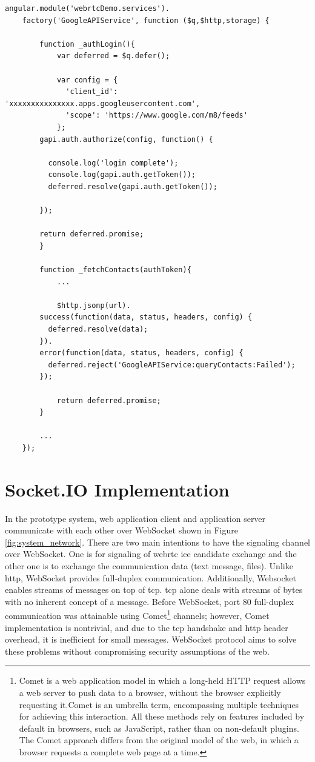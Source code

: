 \begin{lstlisting}[caption={GoogleAPIService.js in application client},label={code:google_api}]
angular.module('webrtcDemo.services').
	factory('GoogleAPIService', function ($q,$http,storage) {

		function _authLogin(){
			var deferred = $q.defer();

			var config = {
		      'client_id': 'xxxxxxxxxxxxxxx.apps.googleusercontent.com',
		      'scope': 'https://www.google.com/m8/feeds'
		    };
	    gapi.auth.authorize(config, function() {

	      console.log('login complete');
	      console.log(gapi.auth.getToken());
	      deferred.resolve(gapi.auth.getToken());

	    });

	    return deferred.promise;
		}

		function _fetchContacts(authToken){
			...
			
			$http.jsonp(url).
	    success(function(data, status, headers, config) {
	      deferred.resolve(data);
	    }).
	    error(function(data, status, headers, config) {
	      deferred.reject('GoogleAPIService:queryContacts:Failed');
	    });

			return deferred.promise;
		}

		...
	});
\end{lstlisting}

\section{Socket.IO Implementation}

\noindent In the prototype system, web application client and application server communicate with each other over WebSocket shown in Figure \ref{fig:system_network}. There are two main intentions to have the signaling channel over WebSocket. One is for signaling of \gls{webrtc} \gls{ice} candidate exchange and the other one is to exchange the communication data (text message, files). Unlike \gls{http}, WebSocket provides full-duplex communication. Additionally, Websocket enables streams of messages on top of \gls{tcp}. \gls{tcp} alone deals with streams of bytes with no inherent concept of a message. Before WebSocket, port 80 full-duplex communication was attainable using Comet\footnote{Comet is a web application model in which a long-held HTTP request allows a web server to push data to a browser, without the browser explicitly requesting it.Comet is an umbrella term, encompassing multiple techniques for achieving this interaction. All these methods rely on features included by default in browsers, such as JavaScript, rather than on non-default plugins. The Comet approach differs from the original model of the web, in which a browser requests a complete web page at a time.\cite{wiki:comet}} channels; however, Comet implementation is nontrivial, and due to the \gls{tcp} handshake and \gls{http} header overhead, it is inefficient for small messages. WebSocket protocol aims to solve these problems without compromising security assumptions of the web.\cite{wiki:websocket}

